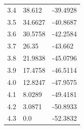 \begin{table}
\begin{tabular}{lll}
3.4 & 38.612 & -39.4928 \\
3.5 & 34.6627 & -40.8687 \\
3.6 & 30.5758 & -42.2584 \\
3.7 & 26.35 & -43.662 \\
3.8 & 21.9838 & -45.0796 \\
3.9 & 17.4758 & -46.5114 \\
4.0 & 12.8247 & -47.9575 \\
4.1 & 8.0289 & -49.4181 \\
4.2 & 3.0871 & -50.8933 \\
4.3 & 0.0 & -52.3832 \\
\bottomrule
\end{tabular}
\end{table}
